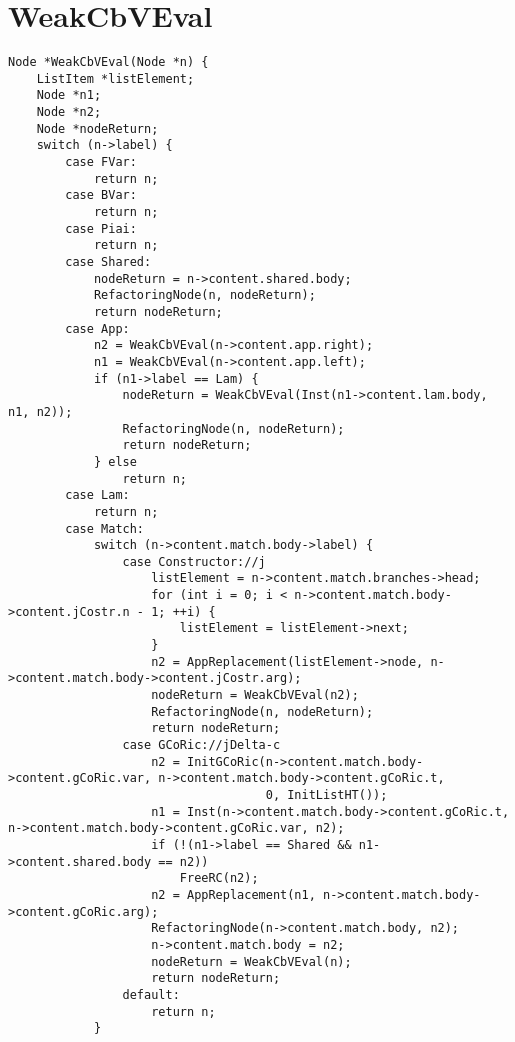 \documentclass[12pt,a4paper,openright,twoside]{report}
\begin{document}
\section{WeakCbVEval}
\begin{verbatim}
Node *WeakCbVEval(Node *n) {
    ListItem *listElement;
    Node *n1;
    Node *n2;
    Node *nodeReturn;
    switch (n->label) {
        case FVar:
            return n;
        case BVar:
            return n;
        case Piai:
            return n;
        case Shared:
            nodeReturn = n->content.shared.body;
            RefactoringNode(n, nodeReturn);
            return nodeReturn;
        case App:
            n2 = WeakCbVEval(n->content.app.right);
            n1 = WeakCbVEval(n->content.app.left);
            if (n1->label == Lam) {
                nodeReturn = WeakCbVEval(Inst(n1->content.lam.body, n1, n2));
                RefactoringNode(n, nodeReturn);
                return nodeReturn;
            } else
                return n;
        case Lam:
            return n;
        case Match:
            switch (n->content.match.body->label) {
                case Constructor://j
                    listElement = n->content.match.branches->head;
                    for (int i = 0; i < n->content.match.body->content.jCostr.n - 1; ++i) {
                        listElement = listElement->next;
                    }
                    n2 = AppReplacement(listElement->node, n->content.match.body->content.jCostr.arg);
                    nodeReturn = WeakCbVEval(n2);
                    RefactoringNode(n, nodeReturn);
                    return nodeReturn;
                case GCoRic://jDelta-c
                    n2 = InitGCoRic(n->content.match.body->content.gCoRic.var, n->content.match.body->content.gCoRic.t,
                                    0, InitListHT());
                    n1 = Inst(n->content.match.body->content.gCoRic.t, n->content.match.body->content.gCoRic.var, n2);
                    if (!(n1->label == Shared && n1->content.shared.body == n2))
                        FreeRC(n2);
                    n2 = AppReplacement(n1, n->content.match.body->content.gCoRic.arg);
                    RefactoringNode(n->content.match.body, n2);
                    n->content.match.body = n2;
                    nodeReturn = WeakCbVEval(n);
                    return nodeReturn;
                default:
                    return n;
            }


\end{verbatim}
\end{document}
